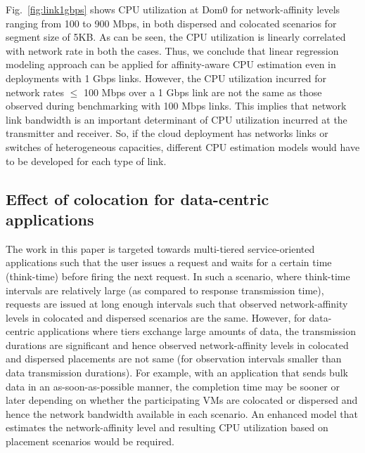 Fig.~\ref{fig:link1gbps} shows CPU utilization at Dom0
for network-affinity levels ranging from 100 to 900 Mbps, in 
both dispersed and colocated scenarios for segment size of
5KB. As can be seen, the CPU utilization is linearly correlated with
network rate in both the cases. 
Thus, we conclude that 
linear regression modeling approach can be applied for affinity-aware
CPU estimation even in deployments with 1 Gbps links. However, 
the CPU utilization
incurred for network rates $\le$ 100 Mbps over a 1 Gbps link are not the 
same as those observed during benchmarking with 100 Mbps links. 
This implies that network link bandwidth is an important
determinant of CPU utilization incurred at the transmitter and
receiver. So, if the cloud deployment has networks links or switches 
of heterogeneous capacities,
different CPU estimation models would have to be
developed for each type of link.

\subsection{Effect of colocation for data-centric applications}
The work in this paper is targeted towards multi-tiered service-oriented
applications such that the user issues a request and waits 
for a certain time (think-time) before firing the next request.
In such a scenario, where think-time intervals are relatively large
(as compared to response transmission time),
requests are issued at long enough intervals
such that observed network-affinity levels
in colocated and dispersed scenarios are the same. 
However, for data-centric applications 
where tiers exchange large amounts of data, the transmission
durations are significant and hence 
observed network-affinity levels in colocated
and dispersed placements are not same (for observation intervals
smaller than data transmission durations).
For example, with an application
that sends bulk data in an as-soon-as-possible manner, the 
completion time may be sooner or later depending
on whether the participating VMs are colocated or dispersed
and hence the network bandwidth available in each scenario. 
An enhanced model that estimates the network-affinity level 
and resulting CPU utilization based on placement scenarios would
be required.

